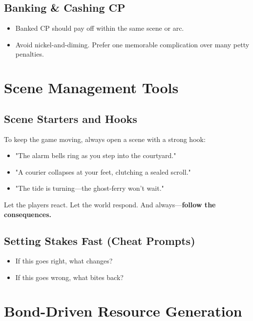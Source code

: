 \subsection{Banking \& Cashing CP}

\begin{itemize}
    \item Banked CP should pay off within the same scene or arc.
    \item Avoid nickel-and-diming. Prefer one memorable complication over many petty penalties.
\end{itemize}

\section{Scene Management Tools}

\subsection{Scene Starters and Hooks}

To keep the game moving, always open a scene with a strong hook:

\begin{itemize}
    \item "The alarm bells ring as you step into the courtyard."
    \item "A courier collapses at your feet, clutching a sealed scroll."
    \item "The tide is turning---the ghost-ferry won't wait."
\end{itemize}

Let the players react. Let the world respond. And always---\textbf{follow the consequences.}

\subsection{Setting Stakes Fast (Cheat Prompts)}

\begin{itemize}
    \item If this goes right, what changes?
    \item If this goes wrong, what bites back?
\end{itemize}

\section{Bond-Driven Resource Generation}

